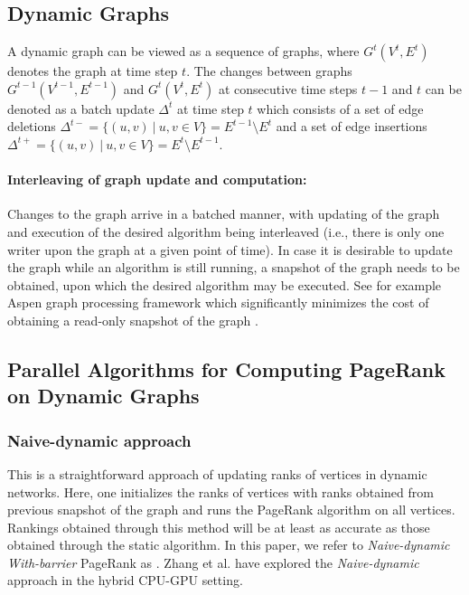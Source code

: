 \subsection{Dynamic Graphs}
\label{sec:about-dynamic}

A dynamic graph can be viewed as a sequence of graphs, where $G^t(V^t, E^t)$ denotes the graph at time step $t$. The changes between graphs $G^{t-1}(V^{t-1}, E^{t-1})$ and $G^t(V^t, E^t)$ at consecutive time steps $t-1$ and $t$ can be denoted as a batch update $\Delta^t$ at time step $t$ which consists of a set of edge deletions $\Delta^{t-} = \{(u, v)\ |\ u, v \in V\} = E^{t-1} \setminus E^t$ and a set of edge insertions $\Delta^{t+} = \{(u, v)\ |\ u, v \in V\} = E^t \setminus E^{t-1}$.

\paragraph{Interleaving of graph update and computation:}

Changes to the graph arrive in a batched manner, with updating of the graph and execution of the desired algorithm being interleaved (i.e., there is only one writer upon the graph at a given point of time). In case it is desirable to update the graph while an algorithm is still running, a snapshot of the graph needs to be obtained, upon which the desired algorithm may be executed. See for example Aspen graph processing framework which significantly minimizes the cost of obtaining a read-only snapshot of the graph \cite{graph-dhulipala19}.




\subsection{Parallel Algorithms for Computing PageRank on Dynamic Graphs}

\subsubsection{Naive-dynamic approach}
\label{sec:about-naive}

This is a straightforward approach of updating ranks of vertices in dynamic networks. Here, one initializes the ranks of vertices with ranks obtained from previous snapshot of the graph and runs the PageRank algorithm on all vertices. Rankings obtained through this method will be at least as accurate as those obtained through the static algorithm. In this paper, we refer to \textit{Naive-dynamic With-barrier} PageRank as \NaiWbar{}. Zhang et al. \cite{rank-zhang17} have explored the \textit{Naive-dynamic} approach in the hybrid CPU-GPU setting.


